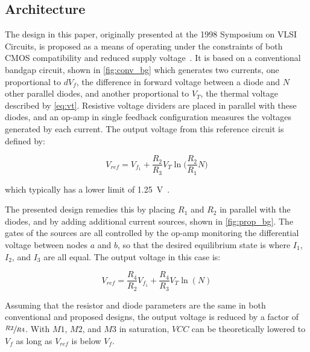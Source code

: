 \documentclass[journal]{IEEEtran}
\begin{document}
\subsection{Architecture}

The design in this paper, originally presented at the 1998 Symposium on VLSI Circuits, is proposed as a means of operating under the constraints of both CMOS compatibility and reduced supply voltage~\cite{Banba1998}. It is based on a conventional bandgap circuit, shown in \cref{fig:conv_bg} which generates two currents, one proportional to \(dV_f\), the difference in forward voltage between a diode and \(N\) other parallel diodes, and another proportional to \(V_T\), the thermal voltage described by \cref{eq:vt}. Resistive voltage dividers are placed in parallel with these diodes, and an op-amp in single feedback configuration measures the voltages generated by each current. The output voltage from this reference circuit is defined by:

\begin{equation}
    V_{ref} = V_{f_1} + \frac{R_2}{R_3}V_T\ln\Biggl(\frac{R_2}{R_1}N\Biggr)
    \label{eq:conv_vout}
\end{equation}

\noindent which typically has a lower limit of \qty{1.25}{\V}~\cite{Razavi2016}. 

The presented design remedies this by placing \(R_1\) and \(R_2\) in parallel with the diodes, and by adding additional current sources, shown in \cref{fig:prop_bg}. The gates of the sources are all controlled by the op-amp monitoring the differential voltage between nodes \(a\) and \(b\), so that the desired equilibrium state is where \(I_1\), \(I_2\), and \(I_3\) are all equal. The output voltage in this case is:

\begin{equation}
    V_{ref} = \frac{R_4}{R_2}V_{f_1} + \frac{R_4}{R_3}V_T \ln{(N)}
    \label{eq:banba_vout}
\end{equation}

\noindent Assuming that the resistor and diode parameters are the same in both conventional and proposed designs, the output voltage is reduced by a factor of \(\sfrac{R2}{R4}\). With \(M1\), \(M2\), and \(M3\) in saturation, \(VCC\) can be theoretically lowered to \(V_f\) as long as \(V_{ref}\) is below \(V_f\).
\end{document}
